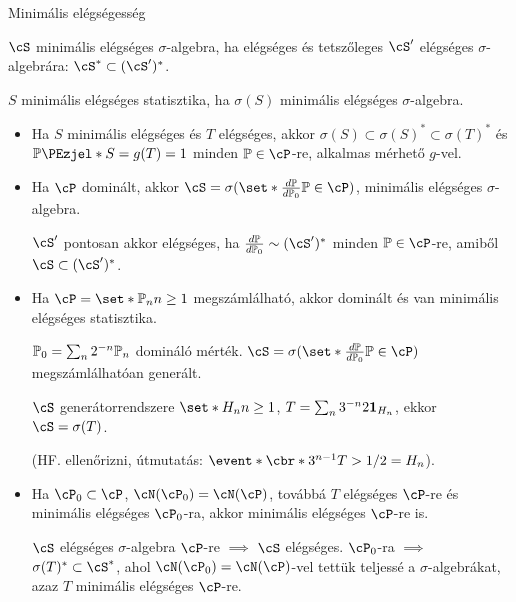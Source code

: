 \documentclass[aspectratio=169,notheorems,9pt,\option]{beamer}
\begin{document}
\begin{frame}{Minimális elégségesség}
  \begin{df}
    $\cS$ minimális elégséges $\sigma$-algebra, ha elégséges és tetszőleges  
    $\cS'$ elégséges $\sigma$-algebrára: $\cS^*\subset (\cS')^*$.

    $S$ minimális elégséges statisztika, ha $\sigma(S)$ minimális elégséges $\sigma$-algebra.
  \end{df}
  \begin{itemize}
    \item Ha $S$ minimális elégséges és $T$ elégséges, akkor $\sigma(S)\subset\sigma(S)^*\subset \sigma(T)^*$ 
    és $\P{S=g(T)}=1$ minden $\P\in\cP$-re, alkalmas mérhető $g$-vel.
    \item Ha $\cP$ dominált, akkor $\cS=\sigma(\set*{\frac{d\P}{d\P[0]}}{\P\in\cP})$,
    minimális elégséges $\sigma$-algebra.
    \pause

    $\cS'$ pontosan akkor elégséges, 
    ha $\frac{d\P}{d\P[0]}\sim(\cS')^*$ minden $\P\in\cP$-re, amiből $\cS\subset(\cS')^*$.

    \item Ha $\cP=\set*{\P[n]}{n\geq1}$ megszámlálható, %
    akkor  dominált és van minimális elégséges statisztika.
    \continue

    $\P[0]=\sum_n 2^{-n}\P[n]$ domináló mérték.
    $\cS=\sigma(\set*{\frac{d\P}{d\P[0]}}{\P\in\cP})$ megszámlálhatóan generált. 

    $\cS$ generátorrendszere $\set*{H_n}{n\geq1}$, $T=\sum_n 3^{-n} 2\I[H_n]$, ekkor 
    $\cS=\sigma(T)$.

    (HF. ellenőrizni, útmutatás: $\event*{\cbr*{3^{n-1} T}>1/2}=H_n$).
    \pause
    \item Ha $\cP_0\subset\cP$, $\cN(\cP_0)=\cN(\cP)$, 
    továbbá $T$ elégséges $\cP$-re és minimális elégséges $\cP_0$-ra, akkor 
    minimális elégséges $\cP$-re is.
    \continue

    $\cS$ elégséges $\sigma$-algebra $\cP$-re $\implies$ $\cS$ elégséges. 
    $\cP_0$-ra $\implies$ $\sigma(T)^*\subset \cS^*$,
    ahol $\cN(\cP_0)=\cN(\cP)$-vel tettük teljessé a 
    $\sigma$-algebrákat, azaz $T$ minimális elégséges $\cP$-re.
  \end{itemize}
\end{frame}
\end{document}
